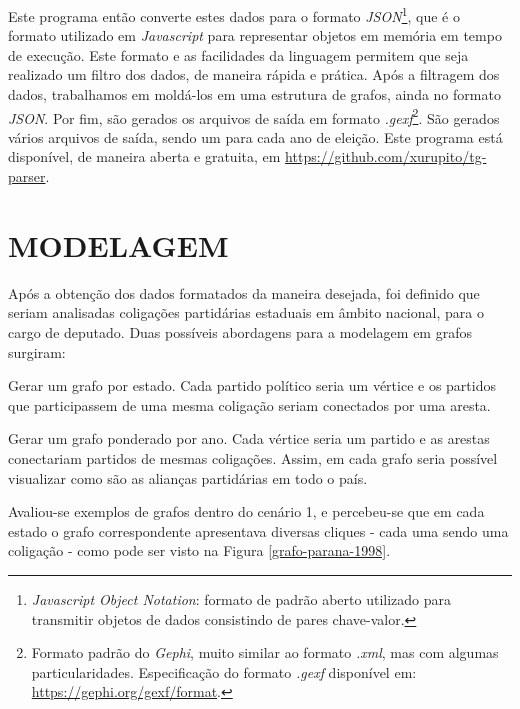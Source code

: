 Este programa então converte estes dados para o formato \emph{JSON}\footnote{\emph{Javascript Object Notation}: formato de padrão aberto utilizado para transmitir objetos de dados consistindo de pares chave-valor.}, que é o formato utilizado em \emph{Javascript} para representar objetos em memória em tempo de execução. Este formato e as facilidades da linguagem permitem que seja realizado um filtro dos dados, de maneira rápida e prática. Após a filtragem dos dados, trabalhamos em moldá-los em uma estrutura de grafos, ainda no formato \emph{JSON}. Por fim, são gerados os arquivos de saída em formato \emph{.gexf}\footnote{Formato padrão do \emph{Gephi}, muito similar ao formato \emph{.xml}, mas com algumas particularidades. Especificação do formato \emph{.gexf} disponível em: \url{https://gephi.org/gexf/format}.}. São gerados vários arquivos de saída, sendo um para cada ano de eleição. Este programa está disponível, de maneira aberta e gratuita, em \url{https://github.com/xurupito/tg-parser}.

\section{\texorpdfstring{\MakeUppercase{Modelagem}}{}}
\label{proposta__modelagem}

Após a obtenção dos dados formatados da maneira desejada, foi definido que seriam analisadas coligações partidárias estaduais em âmbito nacional, para o cargo de deputado. Duas possíveis abordagens para a modelagem em grafos surgiram:
\begin{enumarate}
    \item Gerar um grafo por estado. Cada partido político seria um vértice e os partidos que participassem de uma mesma coligação seriam conectados por uma aresta.
    \item Gerar um grafo ponderado por ano. Cada vértice seria um partido e as arestas conectariam partidos de mesmas coligações. Assim, em cada grafo seria possível visualizar como são as alianças partidárias em todo o país.
\end{enumarate}

Avaliou-se exemplos de grafos dentro do cenário 1, e percebeu-se que em cada estado o grafo correspondente apresentava diversas cliques - cada uma sendo uma coligação - como pode ser visto na Figura \ref{grafo-parana-1998}.

